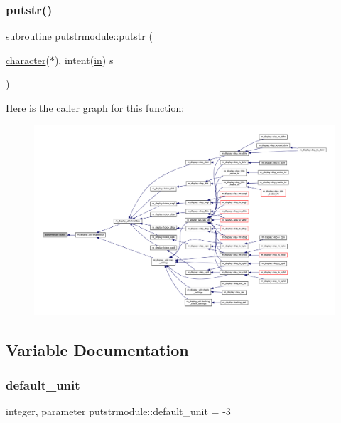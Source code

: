 \subsubsection{\texorpdfstring{putstr()}{putstr()}}
{\footnotesize\ttfamily \hyperlink{M__stopwatch_83_8txt_acfbcff50169d691ff02d4a123ed70482}{subroutine} putstrmodule\+::putstr (\begin{DoxyParamCaption}\item[{\hyperlink{option__stopwatch_83_8txt_abd4b21fbbd175834027b5224bfe97e66}{character}($\ast$), intent(\hyperlink{M__journal_83_8txt_afce72651d1eed785a2132bee863b2f38}{in})}]{s }\end{DoxyParamCaption})}

Here is the caller graph for this function\+:
\nopagebreak
\begin{figure}[H]
\begin{center}
\leavevmode
\includegraphics[width=350pt]{namespaceputstrmodule_a3557206c6eaead47ecd6a04e58f69f90_icgraph}
\end{center}
\end{figure}


\subsection{Variable Documentation}
\mbox{\label{namespaceputstrmodule_a7ec14945bb8449f20f21c0545b1825ee}} 
\subsubsection{\texorpdfstring{default\+\_\+unit}{default\_unit}}
{\footnotesize\ttfamily integer, parameter putstrmodule\+::default\+\_\+unit = -\/3}


